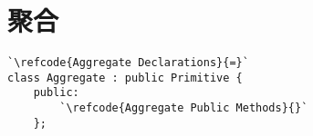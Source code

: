 \section{聚合}\label{sec:聚合}

\label{code:overview_Aggregate}
\begin{lstlisting}
`\refcode{Aggregate Declarations}{=}`
class Aggregate : public Primitive {
    public:
        `\refcode{Aggregate Public Methods}{}`
    };
\end{lstlisting}